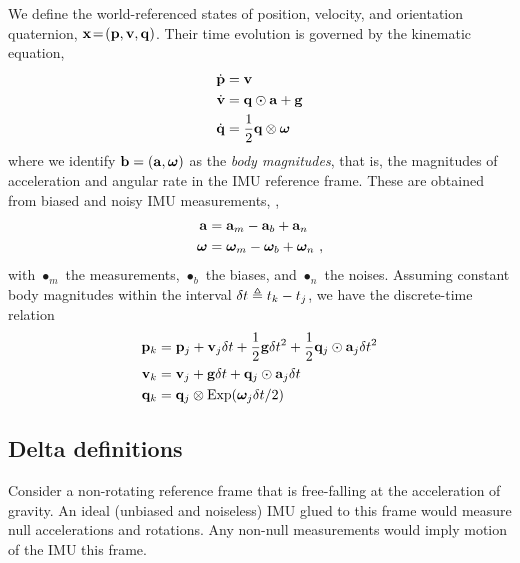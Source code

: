 We define the world-referenced states of position, velocity, and orientation quaternion, ${\bf x}\!=\!({\bf p},{\bf v},{\bf q})$. 
Their time evolution is governed by the kinematic equation,
%
\begin{align}\label{equ:cont_basic}
\begin{split}
\dot{{\bf p}} &= {\bf v} \\
\dot{{\bf v}} &= {\bf q}\odot{\bf a} + {\bf g} \\
\dot{{\bf q}} &= \frac12{\bf q}\otimes{{\bm \omega}} 
\end{split}
\end{align}
%
where we identify ${\bf b}=({\bf a},{{\bm \omega}})$ as the \emph{body magnitudes}, that is, the magnitudes of acceleration and angular rate in the IMU reference frame. These are obtained from biased and noisy IMU measurements, \ie,
%
\begin{align}\label{equ:body}
\begin{split}
{\bf a} &= {\bf a}_m - {{\bf a}_b} + {\bf a}_n \\
{{\bm \omega}} &= {{\bm \omega}}_m - {{{\bm \omega}}_b} + {{\bm \omega}}_n 
~,
\end{split}
\end{align}
%
with $\bullet_m$ the measurements, $\bullet_b$ the biases, and $\bullet_n$ the noises.
Assuming constant body magnitudes within the interval $\delta t\triangleq t_k-t_j$, we have the discrete-time relation
%
\begin{align}\label{equ:g_second_order_integration}
\begin{split}
{\bf p}_{k} &= {\bf p}_j + {\bf v}_j\delta t  + \frac12{\bf g}\delta t^2 + \frac12{\bf q}_j\odot{\bf a}_j\delta t^2 \\
{\bf v}_{k} &= {\bf v}_j + {\bf g}\delta t + {\bf q}_j\odot{\bf a}_j\delta t \\
{\bf q}_{k} &= {\bf q}_j\otimes\operatorname*{Exp}({{\bm \omega}}_j\delta t/2) 
\end{split}
\end{align}


\subsection{Delta definitions}

Consider a non-rotating reference frame that is free-falling at the acceleration of gravity. An ideal (unbiased and noiseless) IMU glued to this frame would measure null accelerations and rotations. Any non-null measurements would imply motion of the IMU \wrt this frame.

